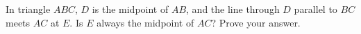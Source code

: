 In triangle $ABC$, $D$ is the midpoint of $AB$, and the line through $D$ parallel to $BC$ meets $AC$ at $E$. Is $E$ always the midpoint of $AC$? Prove your answer.
